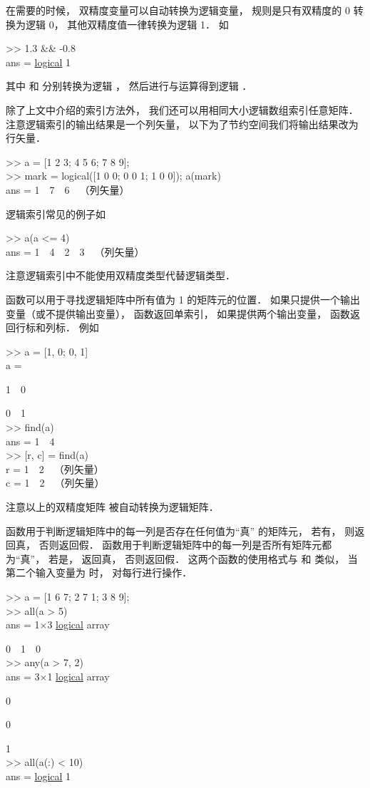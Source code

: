 在需要的时候， 双精度变量可以自动转换为逻辑变量， 规则是只有双精度的 0 转换为逻辑 0， 其他双精度值一律转换为逻辑 1． 如
\begin{Command}
>> 1.3 \&\& -0.8 \\
ans = {\color{blue}\underline{logical}} 1
\end{Command}
其中  和  分别转换为逻辑 ， 然后进行与运算得到逻辑 ．

除了上文中介绍的索引方法外， 我们还可以用相同大小逻辑数组索引任意矩阵． 注意逻辑索引的输出结果是一个列矢量， 以下为了节约空间我们将输出结果改为行矢量．
\begin{Command}
>> a = [1 2 3; 4 5 6; 7 8 9]; \\
>> mark = logical([1 0 0; 0 0 1; 1 0 0]); a(mark) \\
ans = 1\ \ 7\ \ 6\ \ （列矢量）
\end{Command}
逻辑索引常见的例子如
\begin{Command}
>> a(a <= 4) \\
ans = 1\ \ 4\ \ 2\ \ 3\ \ （列矢量）
\end{Command}
注意逻辑索引中不能使用双精度类型代替逻辑类型．

 函数可以用于寻找逻辑矩阵中所有值为 1 的矩阵元的位置． 如果只提供一个输出变量（或不提供输出变量）， 函数返回单索引， 如果提供两个输出变量， 函数返回行标和列标． 例如
\begin{Command}
>> a = [1, 0; 0, 1]\\
a =\par
1\ \ 0\par
0\ \ 1\\
>> find(a)\\
ans = 1\ \ 4\\
>> [r, c] = find(a)\\
r = 1\ \ 2\ \ （列矢量）\\
c = 1\ \ 2\ \ （列矢量）
\end{Command}
注意以上的双精度矩阵  被自动转换为逻辑矩阵． 

 函数用于判断逻辑矩阵中的每一列是否存在任何值为“真” 的矩阵元， 若有， 则返回真， 否则返回假．  函数用于判断逻辑矩阵中的每一列是否所有矩阵元都为“真”， 若是， 返回真， 否则返回假． 这两个函数的使用格式与  和  类似， 当第二个输入变量为  时， 对每行进行操作．
\begin{Command}
>> a = [1 6 7; 2 7 1; 3 8 9];\\
>> all(a > 5)\\
ans = 1×3 {\color{blue}\underline{logical}} array\par
0\ \ 1\ \ 0\\
>> any(a > 7, 2)\\
ans = 3×1 {\color{blue}\underline{logical}} array\par
0\par 0\par 1\\
>> all(a(:) < 10)\\
ans = {\color{blue}\underline{logical}} 1
\end{Command}

